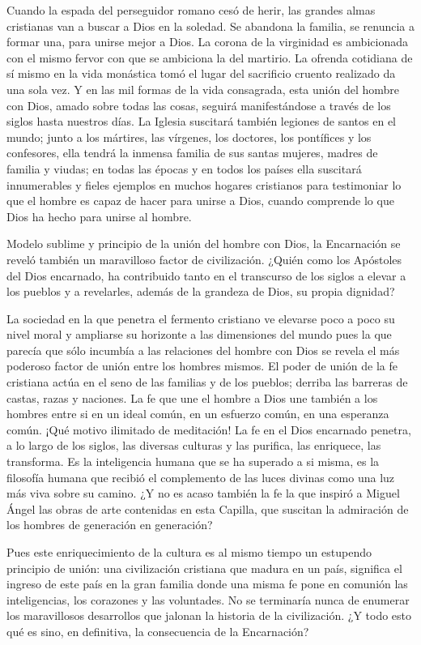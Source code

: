 Cuando la espada del perseguidor romano cesó de herir, las grandes almas cristianas van a buscar a Dios en la soledad. Se abandona la familia, se renuncia a formar una, para unirse mejor a Dios. La corona de la virginidad es ambicionada con el mismo fervor con que se ambiciona la del martirio. La ofrenda cotidiana de sí mismo en la vida monástica tomó el lugar del sacrificio cruento realizado da una sola vez. Y en las mil formas de la vida consagrada, esta unión del hombre con Dios, amado sobre todas las cosas, seguirá manifestándose a través de los siglos hasta nuestros días. La Iglesia suscitará también legiones de santos en el mundo; junto a los mártires, las vírgenes, los doctores, los pontífices y los confesores, ella tendrá la inmensa familia de sus santas mujeres, madres de familia y viudas; en todas las épocas y en todos los países ella suscitará innumerables y fieles ejemplos en muchos hogares cristianos para testimoniar lo que el hombre es capaz de hacer para unirse a Dios, cuando comprende lo que Dios ha hecho para unirse al hombre.

Modelo sublime y principio de la unión del hombre con Dios, la Encarnación se reveló también un maravilloso factor de civilización. ¿Quién como los Apóstoles del Dios encarnado, ha contribuido tanto en el transcurso de los siglos a elevar a los pueblos y a revelarles, además de la grandeza de Dios, su propia dignidad?

La sociedad en la que penetra el fermento cristiano ve elevarse poco a poco su nivel moral y ampliarse su horizonte a las dimensiones del mundo pues la que parecía que sólo incumbía a las relaciones del hombre con Dios se revela el más poderoso factor de unión entre los hombres mismos. El poder de unión de la fe cristiana actúa en el seno de las familias y de los pueblos; derriba las barreras de castas, razas y naciones. La fe que une el hombre a Dios une también a los hombres entre si en un ideal común, en un esfuerzo común, en una esperanza común. ¡Qué motivo ilimitado de meditación! La fe en el Dios encarnado penetra, a lo largo de los siglos, las diversas culturas y las purifica, las enriquece, las transforma. Es la inteligencia humana que se ha superado a si misma, es la filosofía humana que recibió el complemento de las luces divinas como una luz más viva sobre su camino. ¿Y no es acaso también la fe la que inspiró a Miguel Ángel las obras de arte contenidas en esta Capilla, que suscitan la admiración de los hombres de generación en generación?

Pues este enriquecimiento de la cultura es al mismo tiempo un estupendo principio de unión: una civilización cristiana que madura en un país, significa el ingreso de este país en la gran familia donde una misma fe pone en comunión las inteligencias, los corazones y las voluntades. No se terminaría nunca de enumerar los maravillosos desarrollos que jalonan la historia de la civilización. ¿Y todo esto qué es sino, en definitiva, la consecuencia de la Encarnación?

